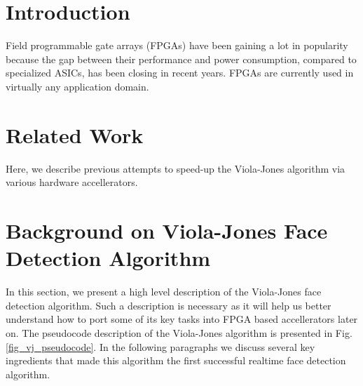 \documentclass[conference]{IEEEtran}
\begin{document}
\IEEEpeerreviewmaketitle



\section {Introduction}


Field programmable gate arrays (FPGAs) have been gaining a lot in popularity because the gap between their performance and power consumption, compared to specialized ASICs, has been closing in recent years.
FPGAs are currently used in virtually any application domain.




\section {Related Work}


Here, we describe previous attempts to speed-up the Viola-Jones algorithm via various hardware accellerators.




\section {Background on Viola-Jones Face Detection Algorithm}


In this section, we present a high level description of the Viola-Jones face detection algorithm. Such a description is necessary as it will help us better understand how to port some of its key tasks into FPGA based accellerators later on.
The pseudocode description of the Viola-Jones algorithm is presented in Fig.\ref{fig_vj_pseudocode}. In the following paragraphs we discuss several key ingredients that made this algorithm the first successful realtime face detection algorithm.
\end{document}
